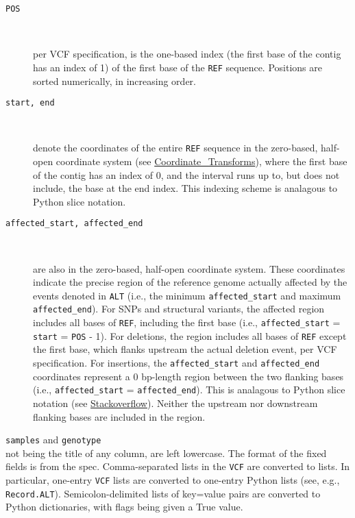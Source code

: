 \begin{description}
  \item[\texttt{POS}] \

    per VCF specification, is the one-based index (the first base of the contig has an index of 1)
    of the first base of the \verb|REF| sequence. Positions are sorted numerically,
    in increasing order.

  \item[\texttt{start, end}] \

    denote the coordinates of the entire \verb|REF| sequence in the zero-based, half-open coordinate
    system (see \href{http://genomewiki.ucsc.edu/index.php/Coordinate_Transforms}{Coordinate\_Transforms}), where
    the first base of the contig has an index of 0, and the interval runs up to, but does not include, the base
    at the end index. This indexing scheme is analagous to Python slice notation.

  \item[\texttt{affected\_start, affected\_end}] \

    are also in the zero-based, half-open coordinate system. These coordinates indicate the precise region
    of the reference genome actually affected by the events denoted in \verb|ALT| (i.e., the minimum
    \verb|affected_start| and maximum \verb|affected_end|).
    For SNPs and structural variants, the affected region includes all bases of \verb|REF|, including the
    first base (i.e., \verb|affected_start| = \verb|start| = \verb|POS| - 1).
    For deletions, the region includes all bases of \verb|REF| except the first base, which flanks
    upstream the actual deletion event, per VCF specification.
    For insertions, the \verb|affected_start| and \verb|affected_end| coordinates represent a
    0 bp-length region between the two flanking bases (i.e., \verb|affected_start| = \verb|affected_end|).
    This is analagous to Python slice notation (see \href{http://stackoverflow.com/a/2947881/38140}{Stackoverflow}).
    Neither the upstream nor downstream flanking bases are included in the region.

\end{description}

\noindent \verb|samples| and \verb|genotype|\\

not being the title of any column, are left lowercase. The format of the fixed
fields is from the spec. Comma-separated lists in the \verb|VCF| are converted to lists. In particular,
one-entry \verb|VCF| lists are converted to one-entry Python lists (see, e.g., \verb|Record.ALT|).
Semicolon-delimited lists of key=value pairs are converted to Python dictionaries, with flags being given a True value.

